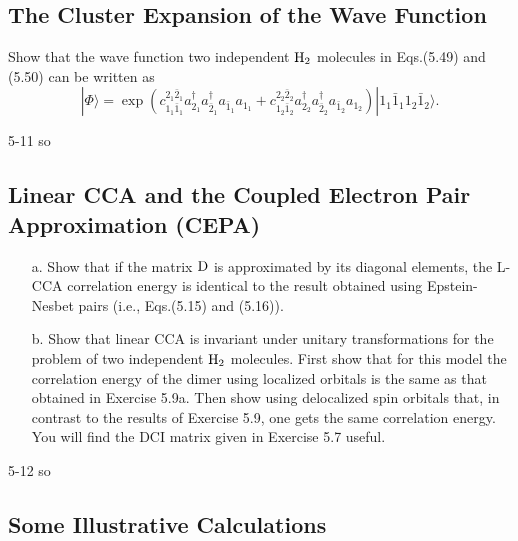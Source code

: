 \documentclass[a4paper]{book}
\begin{document}
	\subsection{The Cluster Expansion of the Wave Function}
	
	\begin{exercise}
	Show that the wave function two independent $\ce{H2}$ molecules in Eqs.(5.49) and (5.50) can be written as
	\[
		| \Phi \rangle = \exp{( c^{2_1 \bar{2}_1}_{1_1 \bar{1}_1} a^\dagger_{2_1} a^\dagger_{\bar{2}_1} a_{\bar{1}_1} a_{1_1} + c^{2_2 \bar{2}_2}_{1_2 \bar{1}_2} a^\dagger_{2_2} a^\dagger_{\bar{2}_2} a_{\bar{1}_2} a_{1_2} )} | 1_1 \bar{1}_1 1_2 \bar{1}_2 \rangle.
	\]
	\end{exercise}
	
	\begin{solution}
		5-11 so
	\end{solution}
	
	\subsection{Linear CCA and the Coupled Electron Pair Approximation (CEPA)}
	
	\begin{exercise}
	\begin{enumerate}
	
	\item[a.] Show that if the matrix ${\rm D}$ is approximated by its diagonal elements, the L-CCA correlation energy is identical to the result obtained using Epstein-Nesbet pairs (i.e., Eqs.(5.15) and (5.16)).
	
	\item[b.] Show that linear CCA is invariant under unitary transformations for the problem of two independent $\ce{H2}$ molecules. First show that for this model the correlation energy of the dimer using localized orbitals is the same as that obtained in Exercise 5.9a. Then show using delocalized spin orbitals that, in contrast to the results of Exercise 5.9, one gets the same correlation energy. You will find the DCI matrix given in Exercise 5.7 useful.
	
	\end{enumerate}
	
	\end{exercise}
	
	\begin{solution}
		5-12 so
	\end{solution}
	
	\subsection{Some Illustrative Calculations}
	
\end{document}
